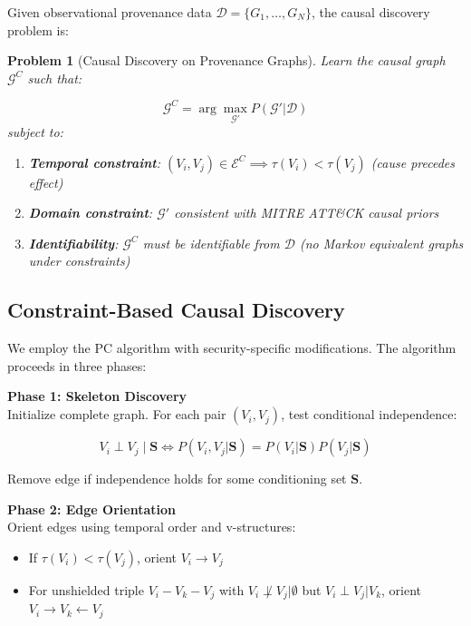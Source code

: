 \documentclass[conference]{IEEEtran}
\newtheorem{problem}{Problem}
\begin{document}
Given observational provenance data $\mathcal{D} = \{G_1, \ldots, G_N\}$, the causal discovery problem is:

\begin{problem}[Causal Discovery on Provenance Graphs]
Learn the causal graph $\mathcal{G}^C$ such that:

\begin{equation}
\mathcal{G}^C = \arg\max_{\mathcal{G}'} P(\mathcal{G}' | \mathcal{D})
\end{equation}
subject to:
\begin{enumerate}
    \item \textbf{Temporal constraint}: $(V_i, V_j) \in \mathcal{E}^C \implies \tau(V_i) < \tau(V_j)$ (cause precedes effect)
    \item \textbf{Domain constraint}: $\mathcal{G}'$ consistent with MITRE ATT\&CK causal priors
    \item \textbf{Identifiability}: $\mathcal{G}^C$ must be identifiable from $\mathcal{D}$ (no Markov equivalent graphs under constraints)
\end{enumerate}
\end{problem}

\subsection{Constraint-Based Causal Discovery}

We employ the PC algorithm \cite{pc_algorithm} with security-specific modifications. The algorithm proceeds in three phases:

\textbf{Phase 1: Skeleton Discovery} \\
Initialize complete graph. For each pair $(V_i, V_j)$, test conditional independence:

\begin{equation}
V_i \perp V_j \mid \mathbf{S} \iff P(V_i, V_j | \mathbf{S}) = P(V_i | \mathbf{S}) P(V_j | \mathbf{S})
\end{equation}

Remove edge if independence holds for some conditioning set $\mathbf{S}$.

\textbf{Phase 2: Edge Orientation} \\
Orient edges using temporal order and v-structures:
\begin{itemize}
    \item If $\tau(V_i) < \tau(V_j)$, orient $V_i \rightarrow V_j$
    \item For unshielded triple $V_i - V_k - V_j$ with $V_i \not\perp V_j | \emptyset$ but $V_i \perp V_j | V_k$, orient $V_i \rightarrow V_k \leftarrow V_j$
\end{itemize}
\end{document}

